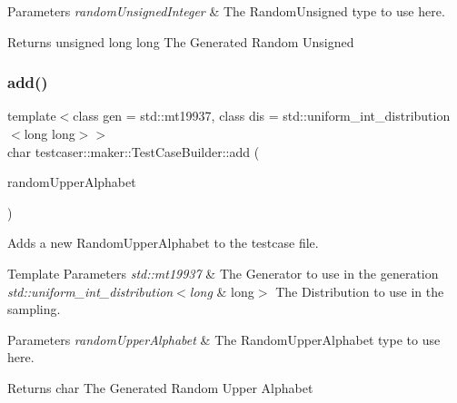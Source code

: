 \begin{DoxyParams}{Parameters}
{\em random\+Unsigned\+Integer} & The Random\+Unsigned type to use here. \\
\hline
\end{DoxyParams}
\begin{DoxyReturn}{Returns}
unsigned long long The Generated Random Unsigned 
\end{DoxyReturn}
\mbox{\label{classtestcaser_1_1maker_1_1TestCaseBuilder_a0d02a42731de8cffd9cc5be67d49290e}} 
\subsubsection{\texorpdfstring{add()}{add()}\hspace{0.1cm}{\footnotesize\ttfamily [11/11]}}
{\footnotesize\ttfamily template$<$class gen  = std\+::mt19937, class dis  = std\+::uniform\+\_\+int\+\_\+distribution$<$long long$>$$>$ \\
char testcaser\+::maker\+::\+Test\+Case\+Builder\+::add (\begin{DoxyParamCaption}\item[{\mbox{\hyperlink{classtestcaser_1_1maker_1_1types_1_1RandomUpperAlphabet}{types\+::\+Random\+Upper\+Alphabet}}$<$ gen, dis $>$ \&}]{random\+Upper\+Alphabet }\end{DoxyParamCaption})\hspace{0.3cm}{\ttfamily [inline]}}



Adds a new Random\+Upper\+Alphabet to the testcase file. 


\begin{DoxyTemplParams}{Template Parameters}
{\em std\+::mt19937} & The Generator to use in the generation \\
\hline
{\em std\+::uniform\+\_\+int\+\_\+distribution$<$long} & long$>$ The Distribution to use in the sampling. \\
\hline
\end{DoxyTemplParams}

\begin{DoxyParams}{Parameters}
{\em random\+Upper\+Alphabet} & The Random\+Upper\+Alphabet type to use here. \\
\hline
\end{DoxyParams}
\begin{DoxyReturn}{Returns}
char The Generated Random Upper Alphabet 
\end{DoxyReturn}
\mbox{\label{classtestcaser_1_1maker_1_1TestCaseBuilder_a41885a504a99f9c450e793e183898488}} 
